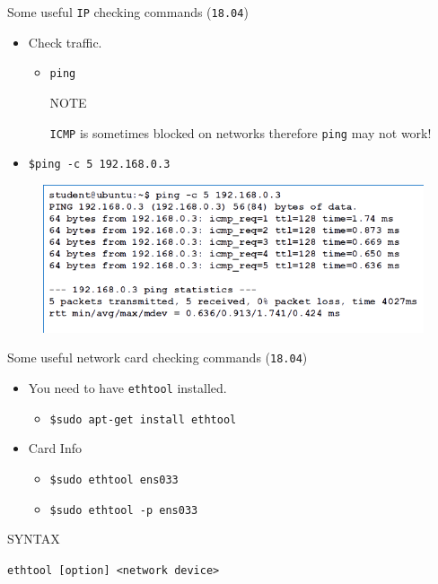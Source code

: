 \documentclass[aspectratio=169]{beamer}
\begin{document}
\begin{frame}{Some useful \texttt{IP} checking commands (\texttt{18.04})}
  \begin{itemize}
    \item Check traffic.
    \begin{itemize}
      \item \texttt{ping}  
      \begin{block}{NOTE}
        \begin{center}
          \texttt{ICMP} is sometimes blocked on networks therefore \texttt{ping} may not work!
        \end{center}
      \end{block}          
    \end{itemize}
    \item \texttt{\$ping -c 5 192.168.0.3}
  \end{itemize}
  \begin{figure}
    \begin{center}
      \includegraphics[width=0.6\linewidth]{ping.png}
    \end{center}
  \end{figure}
\end{frame}

\begin{frame}{Some useful network card checking commands (\texttt{18.04})}
  \begin{itemize}
    \item You need to have \texttt{ethtool} installed.
    \begin{itemize}
      \item \texttt{\$sudo apt-get install ethtool}
    \end{itemize}
    \item Card Info
    \begin{itemize}
      \item \texttt{\$sudo ethtool ens033}
      \item \texttt{\$sudo ethtool -p ens033}
    \end{itemize}
  \end{itemize}
  \begin{block}{SYNTAX}
    \begin{center}
      \texttt{ethtool [option] <network device>}
    \end{center}
  \end{block}
\end{frame}
\end{document}
